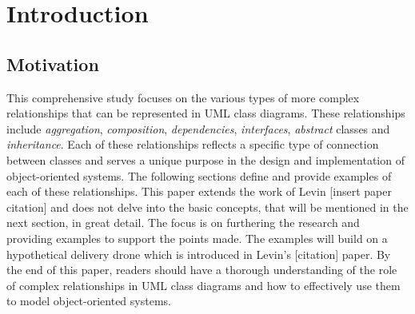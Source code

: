 \documentclass[
	12pt,
    a4paper,
    egregdoesnotlikesansseriftitles, %
    toc=chapterentrywithdots,
    oneside, openany,
    titlepage,
    parskip=half,
    headings=normal,  %
    listof=totoc,
    bibliography=totocnumbered,
    index=totoc,
    captions=tableheading,  %
    listof=flat,
    numbers=noenddot, %
    final]
    {scrbook}
\begin{document}
\setcounter{secnumdepth}{3}  %
\setcounter{tocdepth}{2}  %


\frontmatter


\tableofcontents

\listoffigures
\clearpage %

\listoftables
\clearpage %

\renewcommand{\lstlistlistingname}{List of Listings}  %
\clearpage %

\mainmatter

\chapter{Introduction}


\section{Motivation}
This comprehensive study focuses on the various types of more complex relationships that can be represented in UML class diagrams. 
These relationships include \emph{aggregation}, \emph{composition}, \emph{dependencies}, \emph{interfaces}, \emph{abstract} classes and \emph{inheritance}. 
Each of these relationships reflects a specific type of connection between classes and serves a unique purpose in the design and implementation of object-oriented systems. 
The following sections define and provide examples of each of these relationships.
This paper extends the work of Levin [insert paper citation] and does not delve into the basic concepts, that will be mentioned in the next section, in great detail. 
The focus is on furthering the research and providing examples to support the points made.
The examples will build on a hypothetical delivery drone which is introduced in Levin's [citation] paper.
By the end of this paper, readers should have a thorough understanding of the role of complex relationships in UML class diagrams and how to effectively use them to model object-oriented systems.

\end{document}
